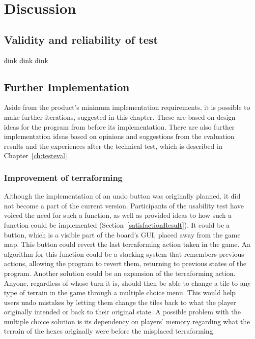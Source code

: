 \chapter{Discussion}\label{ch:discussion}

\section{Validity and reliability of test}
dink dink dink

\section{Further Implementation}
Aside from the product's minimum implementation requirements, it is possible to make further iterations, suggested in this chapter. These are based on design ideas for the program from before its implementation. There are also further implementation ideas based on opinions and suggestions from the evaluation results and the experiences after the technical test, which is described in Chapter~\ref{ch:testeval}.

\subsection{Improvement of terraforming}
Although the implementation of an undo button was originally planned, it did not become a part of the current version. Participants of the usability test have voiced the need for such a function, as well as provided ideas to how such a function could be implemented (Section~\ref{satisfactionResult}). It could be a button, which is a visible part of the board's GUI, placed away from the game map. This button could revert the last terraforming action taken in the game. An algorithm for this function could be a stacking system that remembers previous actions, allowing the program to revert them, returning to previous states of the program. Another solution could be an expansion of the terraforming action. Anyone, regardless of whose turn it is, should then be able to change a tile to any type of terrain in the game through a multiple choice menu. This would help users undo mistakes by letting them change the tiles back to what the player originally intended or back to their original state. A possible problem with the multiple choice solution is its dependency on players' memory regarding what the terrain of the hexes originally were before the misplaced terraforming. 

